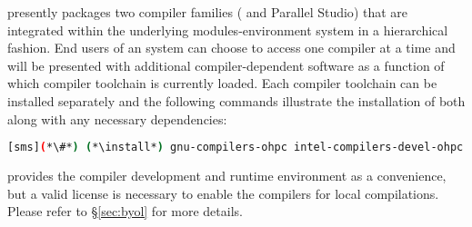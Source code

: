 \OHPC{} presently packages two compiler families ({\GNU{}} and {\IntelR{}
  Parallel Studio}) that are integrated within the underlying
modules-environment system in a hierarchical fashion. End users of an \OHPC{}
system can choose to access one compiler at a time and will be presented with
additional compiler-dependent software as a function of which compiler
toolchain is currently loaded. Each compiler toolchain can be installed
separately and the following commands illustrate the installation of both along
with any necessary dependencies:

\begin{lstlisting}[language=bash]
[sms](*\#*) (*\install*) gnu-compilers-ohpc intel-compilers-devel-ohpc
\end{lstlisting}

\begin{center}
\begin{tcolorbox}[]
\small
\OHPC{} provides the \IntelR{} compiler development and runtime environment as a convenience, but a valid license
is necessary to enable the compilers for local compilations. Please refer to \S\ref{sec:byol} for more details.
\end{tcolorbox}
\end{center}
